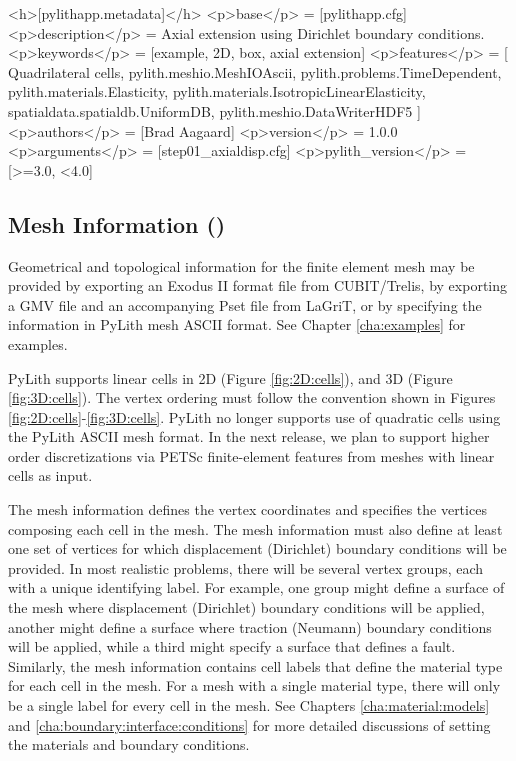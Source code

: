 \begin{cfg}
<h>[pylithapp.metadata]</h>
<p>base</p> = [pylithapp.cfg]
<p>description</p> = Axial extension using Dirichlet boundary conditions.
<p>keywords</p> = [example, 2D, box, axial extension]
<p>features</p> = [
    Quadrilateral cells,
    pylith.meshio.MeshIOAscii,
    pylith.problems.TimeDependent,
    pylith.materials.Elasticity,
    pylith.materials.IsotropicLinearElasticity,
    spatialdata.spatialdb.UniformDB,
    pylith.meshio.DataWriterHDF5
    ]
<p>authors</p> = [Brad Aagaard]
<p>version</p> = 1.0.0
<p>arguments</p> = [step01_axialdisp.cfg]
<p>pylith_version</p> = [>=3.0, <4.0]
\end{cfg}

\subsection{Mesh Information ()}

Geometrical and topological information for the finite element mesh
may be provided by exporting an Exodus II format file from
CUBIT/Trelis, by exporting a GMV file and an accompanying Pset file
from LaGriT, or by specifying the information in PyLith mesh ASCII
format. See Chapter \vref{cha:examples} for examples.

PyLith supports linear cells in 2D (Figure \vref{fig:2D:cells}), and
3D (Figure \vref{fig:3D:cells}).  The vertex ordering must follow the
convention shown in Figures \vref{fig:2D:cells}-\vref{fig:3D:cells}.
PyLith no longer supports use of quadratic cells using the PyLith
ASCII mesh format. In the next release, we plan to support higher
order discretizations via PETSc finite-element features from meshes
with linear cells as input.

The mesh information defines the vertex coordinates and specifies
the vertices composing each cell in the mesh. The mesh information
must also define at least one set of vertices for which displacement
(Dirichlet) boundary conditions will be provided. In most realistic
problems, there will be several vertex groups, each with a unique
identifying label. For example, one group might define a surface of
the mesh where displacement (Dirichlet) boundary conditions will be
applied, another might define a surface where traction (Neumann) boundary
conditions will be applied, while a third might specify a surface
that defines a fault. Similarly, the mesh information contains cell
labels that define the material type for each cell in the mesh. For
a mesh with a single material type, there will only be a single label
for every cell in the mesh. See Chapters \vref{cha:material:models}
and \vref{cha:boundary:interface:conditions} for more detailed discussions
of setting the materials and boundary conditions.


